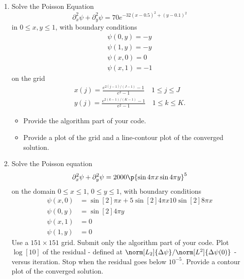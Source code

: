 \documentclass[11pt, oneside]{article}
\begin{document}
\begin{enumerate}
  \item %
    Solve the Poisson Equation
    \[
      \partial_x^2\psi + \partial^2_y\psi = 70e^{-32(x - 0.5)^2 + (y - 0.1)^2}
    \]
    in $0 \le x, y \le 1$, with boundary conditions
    \begin{gather*}
      \psi(0, y) = -y \\
      \psi(1, y) = -y \\
      \psi(x, 0) = 0 \\
      \psi(x, 1) = -1
    \end{gather*}
    on the grid
    \begin{gather*}
      x(j) = \frac{e^{2(j-1)/(J-1)} - 1}{e^2 - 1} \quad 1 \le j \le J \\
      y(j) = \frac{e^{2(k-1)/(K-1)} - 1}{e^2 - 1} \quad 1 \le k \le K.
    \end{gather*}
    \begin{itemize}
      \item Provide the algorithm part of your code.
      \item Provide a plot of the grid and a line-contour plot of the converged solution.
    \end{itemize}

  \item %
    Solve the Poisson equation
    \[
      \partial^2_x \psi + \partial^2_y \psi = 2000\p{\sin{4 \pi x} \sin{4 \pi y}}^5
    \]
    on the domain $0 \le x \le 1$, $0 \le y \le 1$, with boundary conditions
    \begin{align*}
      \psi(x, 0) &= \sin[2]{\pi x} + 5\sin[2]{4\pi x} 10 \sin[2]{8 \pi x} \\
      \psi(0, y) &= \sin[2]{4\pi y} \\
      \psi(x, 1) &= 0 \\
      \psi(1, y) &= 0
    \end{align*}
    Use a $151 \times 151$ grid.
    Submit only the algorithm part of your code.
    Plot $\log[10]{}$ of the residual - defined at
    $\norm[L_2]{\Delta \psi}/\norm[L^2]{\Delta \psi(0)}$ - versus iteration.
    Stop when the residual goes below $10^{-5}$.
    Provide a contour plot of the converged solution.

\end{enumerate}
\end{document}
